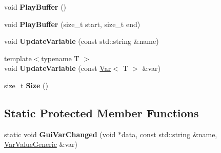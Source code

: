 \begin{DoxyCompactItemize}
\item 
void {\bfseries Play\+Buffer} ()\hypertarget{structpangolin_1_1_input_record_repeat_ac9abc5882d61da21fa39d970e485be5f}{}\label{structpangolin_1_1_input_record_repeat_ac9abc5882d61da21fa39d970e485be5f}

\item 
void {\bfseries Play\+Buffer} (size\+\_\+t start, size\+\_\+t end)\hypertarget{structpangolin_1_1_input_record_repeat_ad4fe53211558dae32bc527b078254f37}{}\label{structpangolin_1_1_input_record_repeat_ad4fe53211558dae32bc527b078254f37}

\item 
void {\bfseries Update\+Variable} (const std\+::string \&name)\hypertarget{structpangolin_1_1_input_record_repeat_a838ce7811bc025c2e40495afd1544390}{}\label{structpangolin_1_1_input_record_repeat_a838ce7811bc025c2e40495afd1544390}

\item 
{\footnotesize template$<$typename T $>$ }\\void {\bfseries Update\+Variable} (const \hyperlink{classpangolin_1_1_var}{Var}$<$ T $>$ \&var)\hypertarget{structpangolin_1_1_input_record_repeat_a34e3e49c066ccc9f34b84e9cb81d1d4f}{}\label{structpangolin_1_1_input_record_repeat_a34e3e49c066ccc9f34b84e9cb81d1d4f}

\item 
size\+\_\+t {\bfseries Size} ()\hypertarget{structpangolin_1_1_input_record_repeat_ab0f6abc691786215269ec7ff7fe25b46}{}\label{structpangolin_1_1_input_record_repeat_ab0f6abc691786215269ec7ff7fe25b46}

\end{DoxyCompactItemize}
\subsection*{Static Protected Member Functions}
\begin{DoxyCompactItemize}
\item 
static void {\bfseries Gui\+Var\+Changed} (void $\ast$data, const std\+::string \&name, \hyperlink{classpangolin_1_1_var_value_generic}{Var\+Value\+Generic} \&var)\hypertarget{structpangolin_1_1_input_record_repeat_a0b98eb9703c760ea23833ae1a96f35e7}{}\label{structpangolin_1_1_input_record_repeat_a0b98eb9703c760ea23833ae1a96f35e7}

\end{DoxyCompactItemize}
